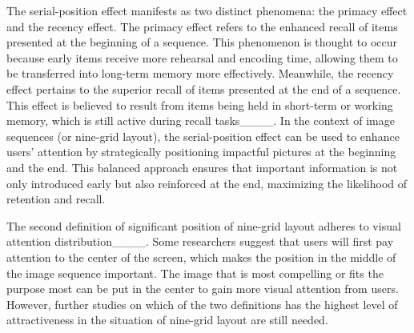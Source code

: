 The serial-position effect manifests as two distinct phenomena: the primacy effect and the recency effect. The primacy effect refers to the enhanced recall of items presented at the beginning of a sequence. This phenomenon is thought to occur because early items receive more rehearsal and encoding time, allowing them to be transferred into long-term memory more effectively. Meanwhile, the recency effect pertains to the superior recall of items presented at the end of a sequence. This effect is believed to result from items being held in short-term or working memory, which is still active during recall tasks____. In the context of image sequences (or nine-grid layout), the serial-position effect can be used to enhance users’ attention by strategically positioning impactful pictures at the beginning and the end. This balanced approach ensures that important information is not only introduced early but also reinforced at the end, maximizing the likelihood of retention and recall. 

The second definition of significant position of nine-grid layout adheres to visual attention distribution____. Some researchers suggest that users will first pay attention to the center of the screen, which makes the position in the middle of the image sequence important. The image that is most compelling or fits the purpose most can be put in the center to gain more visual attention from users. However, further studies on which of the two definitions has the highest level of attractiveness in the situation of nine-grid layout are still needed.